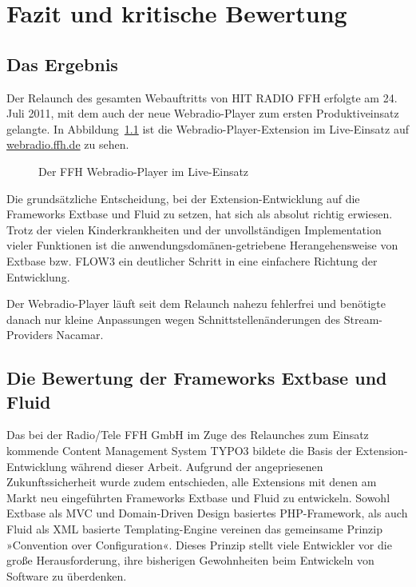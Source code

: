 \chapter{Fazit und kritische Bewertung}
\label{cha:Fazit}


\section{Das Ergebnis}
\label{sec:Ergebnis}

Der Relaunch des gesamten Webauftritts von HIT RADIO FFH erfolgte am 24.\,Juli 2011, mit dem auch der neue Webradio-Player zum ersten Produktiveinsatz gelangte. In Abbildung~\ref{fig:FfhWebradioEndversion} ist die Webradio-Player-Extension im Live-Einsatz auf \href{http://webradio.ffh.de/}{webradio.ffh.de} zu sehen. 

\begin{figure}[htbp]
	\begin{center}
		\caption[FFH Webradio-Player im Live-Einsatz]{Der FFH Webradio-Player im Live-Einsatz}
		\label{fig:FfhWebradioEndversion}
	\end{center}
\end{figure}

Die grunds\"atzliche Entscheidung, bei der Extension-Entwicklung auf die Frame\-works Extbase und Fluid zu setzen, hat sich als absolut richtig erwiesen. Trotz der vielen Kinderkrankheiten und der unvollst\"andigen Implementation vieler Funktionen ist die anwendungsdom\"anen-getriebene Herangehensweise von Extbase bzw. FLOW3 ein deutlicher Schritt in eine einfachere Richtung der Entwicklung. 

Der Webradio-Player l\"auft seit dem Relaunch nahezu fehlerfrei und ben\"otigte danach nur kleine Anpassungen wegen Schnittstellen\"anderungen des Stream-Providers Nacamar.


\newpage

\section{Die Bewertung der Frameworks Extbase und Fluid}
\label{sec:BewertungFrameworks}


Das bei der Radio/Tele FFH GmbH im Zuge des Relaunches zum Einsatz kommende Content Management System TYPO3 bildete die Basis der Extension-Entwicklung w\"ahrend dieser Arbeit. Aufgrund der angepriesenen Zukunftssicherheit wurde zudem entschieden, alle Extensions mit denen am Markt neu eingef\"uhrten Frameworks Extbase und Fluid zu entwickeln. Sowohl Extbase als MVC und Domain-Driven Design basiertes PHP-Framework, als auch Fluid als XML basierte Templating-Engine vereinen das gemeinsame Prinzip »Convention over Configuration«. Dieses Prinzip stellt viele Entwickler vor die gro{\ss}e Herausforderung, ihre bisherigen Gewohnheiten beim Entwickeln von Software zu \"uberdenken.

